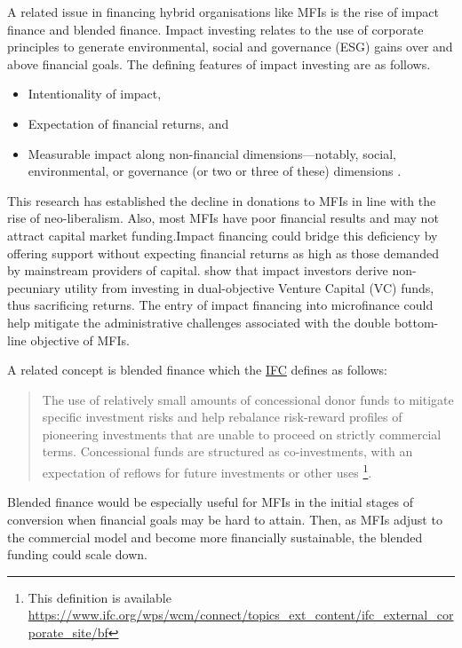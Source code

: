 \documentclass[a4paper, nobind]{templates/ociamthesis}
\begin{document}
A related issue in financing hybrid organisations like MFIs is the rise of impact finance and blended finance. Impact investing relates to the use of corporate principles to generate environmental, social and governance (ESG) gains over and above financial goals. The defining features of impact investing are as follows.

\begin{itemize}
\item
  Intentionality of impact,
\item
  Expectation of financial returns, and
\item
  Measurable impact along non-financial dimensions---notably, social, environmental, or governance (or two or three of these) dimensions \autocite{caseau2020impact}.
\end{itemize}

This research has established the decline in donations to MFIs in line with the rise of neo-liberalism. Also, most MFIs have poor financial results and may not attract capital market funding.Impact financing could bridge this deficiency by offering support without expecting financial returns as high as those demanded by mainstream providers of capital. \textcite{barber2021impact} show that impact investors derive non-pecuniary utility from investing in dual-objective Venture Capital (VC) funds, thus sacrificing returns. The entry of impact financing into microfinance could help mitigate the administrative challenges associated with the double bottom-line objective of MFIs.

A related concept is blended finance \autocite{attridge2019blended} which the \href{https://www.ifc.org/wps/wcm/connect/topics_ext_content/ifc_external_corporate_site/bf}{IFC} defines as follows:

\begin{quote}
The use of relatively small amounts of concessional donor funds to mitigate specific investment risks and help rebalance risk-reward profiles of pioneering investments that are unable to proceed on strictly commercial terms. Concessional funds are structured as co-investments, with an expectation of reflows for future investments or other uses \footnote{This definition is available \url{https://www.ifc.org/wps/wcm/connect/topics_ext_content/ifc_external_corporate_site/bf}}.
\end{quote}

Blended finance would be especially useful for MFIs in the initial stages of conversion when financial goals may be hard to attain. Then, as MFIs adjust to the commercial model and become more financially sustainable, the blended funding could scale down.
\end{document}
